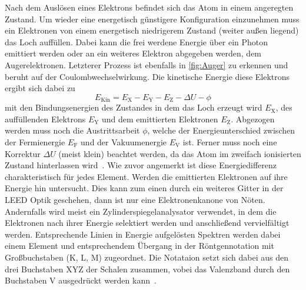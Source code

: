         Nach dem Auslösen eines Elektrons befindet sich das Atom in einem angeregten Zustand.
        Um wieder eine energetisch günstigere Konfiguration einzunehmen muss ein Elektronen von einem energetisch niedrigerem Zustand (weiter außen liegend) das Loch auffüllen.
        Dabei kann die frei werdene Energie über ein Photon emittiert werden oder an ein weiteres Elektron abgegeben werden, dem Augerelektronen.
        Letzterer Prozess ist ebenfalls in \autoref{fig:Auger} zu erkennen und beruht auf der Coulombwechselwirkung.
        Die kinetische Energie diese Elektrons ergibt sich dabei zu
        \begin{equation}
            E_\text{Kin} = E_\text{X} - E_\text{Y} -E_\text{Z} - \Delta U - \phi
        \end{equation}
        mit den Bindungsenergien des Zustandes in dem das Loch erzeugt wird $E_\text{X}$, des auffüllenden Elektrons $E_\text{Y}$ und dem emittierten Elektronen $E_\text{Z}$.
        Abgezogen werden muss noch die Austrittsarbeit $\phi$, welche der Energieunterschied zwischen der Fermienergie $E_\text{F}$ und der Vakuumenergie $E_\text{V}$ ist.
        Ferner muss noch eine Korrektur $\Delta U$ (meist klein) beachtet werden, da das Atom im zweifach ionisierten Zustand hinterlassen wird~\cite{Fauster}.
        Wie zuvor angemerkt ist diese Energiedifferenz charakteristisch für jedes Element.
        Werden die emittierten Elektronen auf ihre Energie hin untersucht.
        Dies kann zum einen durch ein weiteres Gitter in der LEED Optik geschehen, dann ist nur eine Elektronenkanone von Nöten.
        Andernfalls wird meist ein Zylinderspiegelanalysator verwendet, in dem die Elektronen nach ihrer Energie selektiert werden und anschließend vervielfältigt werden.
        Entsprechende Linien in Energie aufgelösten Spektren werden dabei einem Element und entsprechendem Übergang in der Röntgennotation mit Großbuchstaben (K, L, M) zugeordnet.
        Die Notataion setzt sich dabei aus den drei Buchstaben XYZ der Schalen zusammen, vobei das Valenzband durch den Buchstaben V ausgedrückt werden kann~\cite{Fauster}.

